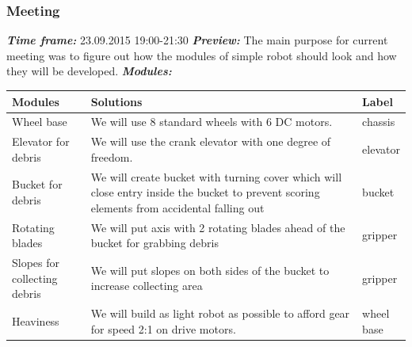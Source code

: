 \addtocounter{number_of_meeting}{1}
\subsubsection{ Meeting}
	\textit{\textbf{Time frame:}} 23.09.2015 19:00-21:30 \newline
	\textit{\textbf{Preview:}} The main purpose for current meeting was to figure out how the modules of simple robot should look and how they will be developed. \newline \newline
	\textit{\textbf{Modules:}}

  \begin{table}[H]
	\vspace{-2mm}
	\begin{center}
		\begin{tabular}{|p{0.2\linewidth}|p{0.7\linewidth}|p{0.1\linewidth}|}
			\hline
			Modules & Solutions & Label \\
			\hline
			Wheel base & We will use 8 standard wheels with 6 DC motors. & chassis \\
			\hline
			Elevator for debris & We will use the crank elevator with one degree of freedom. & elevator \\
			\hline
			Bucket for debris & We will create bucket with turning cover which will close entry inside the bucket to prevent scoring elements from accidental falling out & bucket \\
			\hline
			Rotating blades & We will put axis with 2 rotating blades ahead of the bucket for grabbing debris & gripper \\
			\hline
			Slopes for collecting debris & We will put slopes on both sides of the bucket to increase collecting area & gripper \\
			\hline
			Heaviness & We will build as light robot as possible to afford gear for speed 2:1 on drive motors. & wheel base \\
			\hline
		\end{tabular}
	\end{center}
  \end{table}
  
